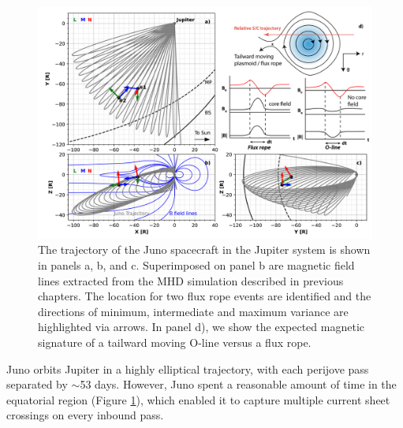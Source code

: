 \begin{figure}
    \centering
    \includegraphics[width=\textwidth]{images6/locations-fluxropes.jpg}
    \caption{The trajectory of the Juno spacecraft in the Jupiter system is shown in panels a, b, and c. Superimposed on panel b are magnetic field lines extracted from the MHD simulation described in previous chapters. The location for two flux rope events are identified and the directions of minimum, intermediate and maximum variance are highlighted via arrows. In panel d), we show the expected magnetic signature of a tailward moving O-line versus a flux rope.}
    \label{fig:locations-fluxropes-eg}
\end{figure}

Juno orbits Jupiter in a highly elliptical trajectory, with each perijove pass separated by $\sim$53 days. However, Juno spent a reasonable amount of time in the equatorial region (Figure \ref{fig:locations-fluxropes-eg}), which enabled it to capture multiple current sheet crossings on every inbound pass. 

